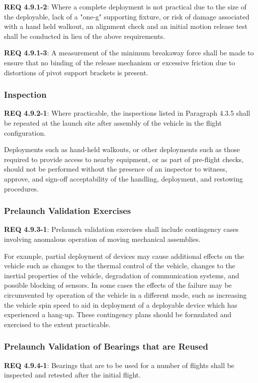 \documentclass[12pt]{article}
\begin{document}
\noindent \textbf{REQ 4.9.1-2}: Where a complete deployment is not practical due to the size of the deployable, lack of a "one-g" supporting fixture, or risk of damage associated with a hand held walkout, an alignment check and an initial motion release test shall be conducted in lieu of the above requirements. 

\noindent \textbf{REQ 4.9.1-3}: A measurement of the minimum breakaway force shall be made to ensure that no binding of the release mechanism or excessive friction due to distortions of pivot support brackets is present.


\subsubsection{Inspection} %
\noindent \textbf{REQ 4.9.2-1}: Where practicable, the inspections listed in Paragraph 4.3.5 shall be repeated at the launch site after assembly of the vehicle in the flight configuration.

Deployments such as hand-held walkouts, or other deployments such as those required to provide access to nearby equipment, or as part of pre-flight checks, should not be performed without the presence of an inspector to witness, approve, and sign-off acceptability of the handling, deployment, and restowing procedures.


\subsubsection{Prelaunch Validation Exercises} %
\noindent \textbf{REQ 4.9.3-1}: Prelaunch validation exercises shall include contingency cases involving anomalous operation of moving mechanical assemblies. 

For example, partial deployment of devices may cause additional effects on the vehicle such as changes to the thermal control of the vehicle, changes to the inertial properties of the vehicle, degradation of communication systems, and possible blocking of sensors. 
In some cases the effects of the failure may be circumvented by operation of the vehicle in a different mode, such as increasing the vehicle spin speed to aid in deployment of a deployable device which has experienced a hang-up. 
These contingency plans should be formulated and exercised to the extent practicable.


\subsubsection{Prelaunch Validation of Bearings that are Reused} %
\noindent \textbf{REQ 4.9.4-1}: Bearings that are to be used for a number of flights shall be inspected and retested after the initial flight. 
\end{document}
